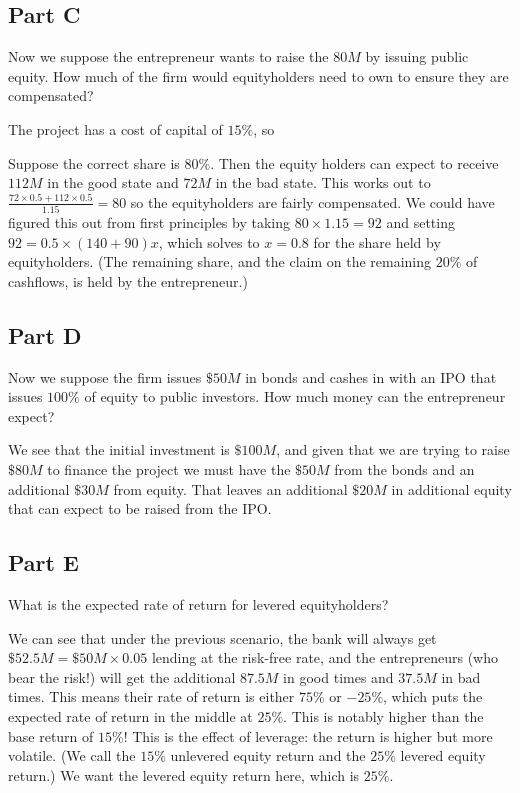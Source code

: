 \documentclass[12pt, letterpaper, parskip = full]{article}
\begin{document}
    \subsection{Part C}

    Now we suppose the entrepreneur wants to raise the \(80M\) by issuing public equity. How much of the firm would equityholders need to own to ensure they are compensated?

    The project has a cost of capital of \(15\%\), so 

    Suppose the correct share is \(80\%\). Then the equity holders can expect to receive \(112M\) in the good state and \(72M\) in the bad state. This works out to \(\frac{72 \times 0.5 + 112 \times 0.5}{1.15} = 80\) so the equityholders are fairly compensated. We could have figured this out from first principles by taking \(80 \times 1.15 = 92\) and setting \(92 = 0.5 \times (140 + 90) x\), which solves to \(x = 0.8\) for the share held by equityholders. (The remaining share, and the claim on the remaining \(20\%\) of cashflows, is held by the entrepreneur.)

    \subsection{Part D}

    Now we suppose the firm issues \(\$50M\) in bonds and cashes in with an IPO that issues \(100\%\) of equity to public investors. How much money can the entrepreneur expect?

    We see that the initial investment is \(\$100M\), and given that we are trying to raise \(\$80M\) to finance the project we must have the \(\$50M\) from the bonds and an additional \(\$30M\) from equity. That leaves an additional \(\$20M\) in additional equity that can expect to be raised from the IPO.
    

    \subsection{Part E} 

    What is the expected rate of return for levered equityholders?

    We can see that under the previous scenario, the bank will always get \(\$52.5M = \$50M \times 0.05\) lending at the risk-free rate, and the entrepreneurs (who bear the risk!) will get the additional \(87.5M\) in good times and \(37.5M\) in bad times. This means their rate of return is either \(75\%\) or \(-25\%\), which puts the expected rate of return in the middle at \(25\%\). This is notably higher than the base return of \(15\%\)! This is the effect of leverage: the return is higher but more volatile. (We call the \(15\%\) unlevered equity return and the \(25\%\) levered equity return.) We want the levered equity return here, which is \(25\%\).
    
\end{document}
